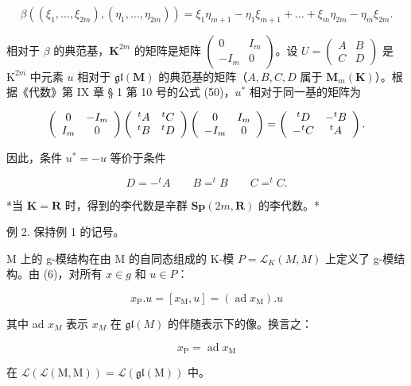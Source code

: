 \[
\beta ((\xi_ {1}, \dots , \xi_ {2 m}), (\eta_ {1}, \dots , \eta_ {2 m})) = \xi_ {1} \eta_ {m + 1} - \eta_ {1} \xi_ {m + 1} + \dots + \xi_ {m} \eta_ {2 m} - \eta_ {m} \xi_ {2 m}.
\]

相对于 \(\beta\) 的典范基，\(\mathbf{K}^{2m}\) 的矩阵是矩阵 \(\left( \begin{array}{cc}0 & I_m\\ -I_m & 0 \end{array} \right)\)。设 \(U = \left( \begin{array}{cc}A & B\\ C & D \end{array} \right)\) 是 \(\mathrm{K}^{2m}\) 中元素 \(u\) 相对于 \(\mathfrak{gl}(\mathbf{M})\) 的典范基的矩阵（\(A,B,C,D\) 属于 \(\mathbf{M}_m(\mathbf{K})\)）。根据《代数》第 IX 章 § 1 第 10 号的公式 (50)，\(u^*\) 相对于同一基的矩阵为

\[
\left( \begin{array}{c c} 0 & - I _ {m} \\ I _ {m} & 0 \end{array} \right) \left( \begin{array}{c c} ^ {t} A & ^ {t} C \\ ^ {t} B & ^ {t} D \end{array} \right) \left( \begin{array}{c c} 0 & I _ {m} \\ - I _ {m} & 0 \end{array} \right) = \left( \begin{array}{c c} ^ {t} D & - ^ {t} B \\ - ^ {t} C & ^ {t} A \end{array} \right).
\]

因此，条件 \(u^{*} = -u\) 等价于条件

\[
D = - ^ {t} A \qquad B = ^ {t} B \qquad C = ^ {t} C.
\]

*当 \(\mathbf{K} = \mathbf{R}\) 时，得到的李代数是辛群 \(\mathbf{Sp}(2m, \mathbf{R})\) 的李代数。*

例 2. 保持例 1 的记号。

M 上的 g-模结构在由 M 的自同态组成的 K-模 \(P = \mathcal{L}_{K}(M, M)\) 上定义了 g-模结构。由 (6)，对所有 \(x \in g\) 和 \(u \in P\)：

\[
x _ {\mathrm{P}}. u = \left[ x _ {\mathrm{M}}, u \right] = (\operatorname{ad} x _ {\mathrm{M}}). u\tag{11}
\]

其中 ad \(x_{M}\) 表示 \(x_{M}\) 在 \(\mathfrak{gl}(M)\) 的伴随表示下的像。换言之：

\[
x _ {\mathrm{P}} = \operatorname{ad} x _ {\mathrm{M}}\tag{12}
\]

在 \(\mathcal{L}(\mathcal{L}(\mathrm{M},\mathrm{M})) = \mathcal{L}(\mathfrak{gl}(\mathrm{M}))\) 中。

